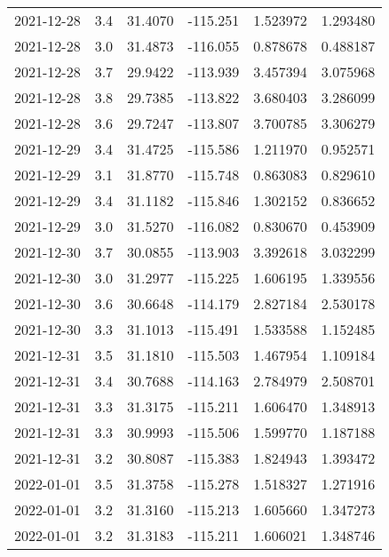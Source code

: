 \begin{tabular}{lrrrrr}
2021-12-28 &       3.4 &  31.4070 &  -115.251 &         1.523972 &         1.293480 \\
2021-12-28 &       3.0 &  31.4873 &  -116.055 &         0.878678 &         0.488187 \\
2021-12-28 &       3.7 &  29.9422 &  -113.939 &         3.457394 &         3.075968 \\
2021-12-28 &       3.8 &  29.7385 &  -113.822 &         3.680403 &         3.286099 \\
2021-12-28 &       3.6 &  29.7247 &  -113.807 &         3.700785 &         3.306279 \\
2021-12-29 &       3.4 &  31.4725 &  -115.586 &         1.211970 &         0.952571 \\
2021-12-29 &       3.1 &  31.8770 &  -115.748 &         0.863083 &         0.829610 \\
2021-12-29 &       3.4 &  31.1182 &  -115.846 &         1.302152 &         0.836652 \\
2021-12-29 &       3.0 &  31.5270 &  -116.082 &         0.830670 &         0.453909 \\
2021-12-30 &       3.7 &  30.0855 &  -113.903 &         3.392618 &         3.032299 \\
2021-12-30 &       3.0 &  31.2977 &  -115.225 &         1.606195 &         1.339556 \\
2021-12-30 &       3.6 &  30.6648 &  -114.179 &         2.827184 &         2.530178 \\
2021-12-30 &       3.3 &  31.1013 &  -115.491 &         1.533588 &         1.152485 \\
2021-12-31 &       3.5 &  31.1810 &  -115.503 &         1.467954 &         1.109184 \\
2021-12-31 &       3.4 &  30.7688 &  -114.163 &         2.784979 &         2.508701 \\
2021-12-31 &       3.3 &  31.3175 &  -115.211 &         1.606470 &         1.348913 \\
2021-12-31 &       3.3 &  30.9993 &  -115.506 &         1.599770 &         1.187188 \\
2021-12-31 &       3.2 &  30.8087 &  -115.383 &         1.824943 &         1.393472 \\
2022-01-01 &       3.5 &  31.3758 &  -115.278 &         1.518327 &         1.271916 \\
2022-01-01 &       3.2 &  31.3160 &  -115.213 &         1.605660 &         1.347273 \\
2022-01-01 &       3.2 &  31.3183 &  -115.211 &         1.606021 &         1.348746 \\

\end{tabular}
